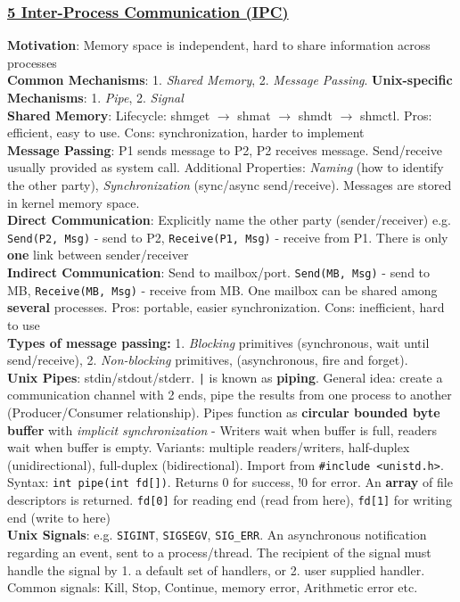 \documentclass{article}
\begin{document}
\begin{multicols*}{3}
\subsubsection*{\underline{5 Inter-Process Communication (IPC)}}
\textbf{Motivation}: Memory space is independent, hard to share information across processes \\
\textbf{Common Mechanisms}: 1. \textit{Shared Memory}, 2. \textit{Message Passing}. \textbf{Unix-specific Mechanisms}: 1. \textit{Pipe}, 2. \textit{Signal} \\
\textbf{Shared Memory}: Lifecycle: shmget $\to$ shmat $\to$ shmdt $\to$ shmctl. Pros: efficient, easy to use. Cons: synchronization, harder to implement \\
\textbf{Message Passing}: P1 sends message to P2, P2 receives message. Send/receive usually provided as system call. Additional Properties: \textit{Naming} (how to identify the other party), \textit{Synchronization} (sync/async send/receive). Messages are stored in kernel memory space. \\
\textbf{Direct Communication}: Explicitly name the other party (sender/receiver) e.g. \texttt{Send(P2, Msg)} - send to P2, \texttt{Receive(P1, Msg)} - receive from P1. There is only \textbf{one} link between sender/receiver \\ 
\textbf{Indirect Communication}: Send to mailbox/port. \texttt{Send(MB, Msg)} - send to MB, \texttt{Receive(MB, Msg)} - receive from MB. One mailbox can be shared among \textbf{several} processes. Pros: portable, easier synchronization. Cons: inefficient, hard to use \\
\textbf{Types of message passing:} 1. \textit{Blocking} primitives (synchronous, wait until send/receive), 2. \textit{Non-blocking} primitives, (asynchronous, fire and forget). \\
\textbf{Unix Pipes}: stdin/stdout/stderr. \texttt{|} is known as \textbf{piping}. General idea: create a communication channel with 2 ends, pipe the results from one process to another (Producer/Consumer relationship). Pipes function as \textbf{circular bounded byte buffer} with \textit{implicit synchronization} - Writers wait when buffer is full, readers wait when buffer is empty. Variants: multiple readers/writers, half-duplex (unidirectional), full-duplex (bidirectional). Import from \texttt{\#include <unistd.h>}. Syntax: \texttt{int pipe(int fd[])}. Returns 0 for success, !0 for error. An \textbf{array} of file descriptors is returned. \texttt{fd[0]} for reading end (read from here), \texttt{fd[1]} for writing end (write to here) \\
\textbf{Unix Signals}: e.g. \texttt{SIGINT}, \texttt{SIGSEGV}, \texttt{SIG\_ERR}. An asynchronous notification regarding an event, sent to a process/thread. The recipient of the signal must handle the signal by 1. a default set of handlers, or 2. user supplied handler. Common signals: Kill, Stop, Continue, memory error, Arithmetic error etc. 

\end{multicols*}
\end{document}
